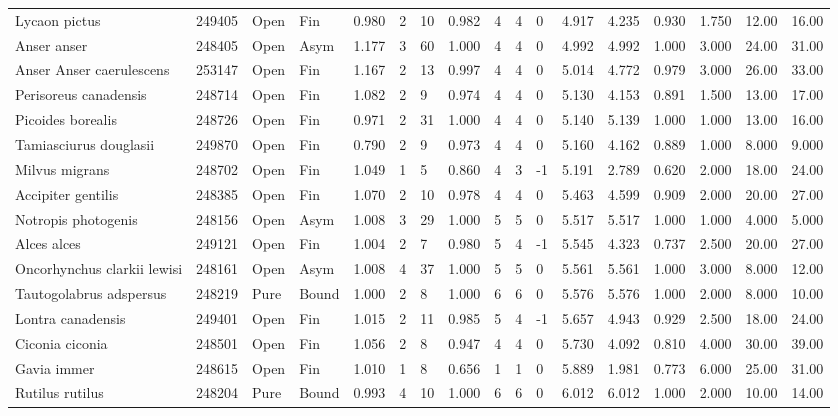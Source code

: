 \documentclass[10pt,a4paper]{amsart}
\theoremstyle{definition}
\theoremstyle{remark}
\numberwithin{equation}{section}
\begin{document}
\begin{table}[ht]
{\begin{tabular}{lllllllllllllllll}
Lycaon pictus & 249405 & Open & Fin & 0.980 & 2 & 10 & 0.982 & 4 & 4 & 0 & 4.917 & 4.235 & 0.930 & 1.750 & 12.00 & 16.00 \\
Anser anser & 248405 & Open & Asym & 1.177 & 3 & 60 & 1.000 & 4 & 4 & 0 & 4.992 & 4.992 & 1.000 & 3.000 & 24.00 & 31.00 \\
Anser Anser caerulescens & 253147 & Open & Fin & 1.167 & 2 & 13 & 0.997 & 4 & 4 & 0 & 5.014 & 4.772 & 0.979 & 3.000 & 26.00 & 33.00 \\
Perisoreus canadensis & 248714 & Open & Fin & 1.082 & 2 & 9 & 0.974 & 4 & 4 & 0 & 5.130 & 4.153 & 0.891 & 1.500 & 13.00 & 17.00 \\
Picoides borealis & 248726 & Open & Fin & 0.971 & 2 & 31 & 1.000 & 4 & 4 & 0 & 5.140 & 5.139 & 1.000 & 1.000 & 13.00 & 16.00 \\
Tamiasciurus douglasii & 249870 & Open & Fin & 0.790 & 2 & 9 & 0.973 & 4 & 4 & 0 & 5.160 & 4.162 & 0.889 & 1.000 & 8.000 & 9.000 \\
Milvus migrans & 248702 & Open & Fin & 1.049 & 1 & 5 & 0.860 & 4 & 3 & -1 & 5.191 & 2.789 & 0.620 & 2.000 & 18.00 & 24.00 \\
Accipiter gentilis & 248385 & Open & Fin & 1.070 & 2 & 10 & 0.978 & 4 & 4 & 0 & 5.463 & 4.599 & 0.909 & 2.000 & 20.00 & 27.00 \\
Notropis photogenis & 248156 & Open & Asym & 1.008 & 3 & 29 & 1.000 & 5 & 5 & 0 & 5.517 & 5.517 & 1.000 & 1.000 & 4.000 & 5.000 \\
Alces alces & 249121 & Open & Fin & 1.004 & 2 & 7 & 0.980 & 5 & 4 & -1 & 5.545 & 4.323 & 0.737 & 2.500 & 20.00 & 27.00 \\
Oncorhynchus clarkii lewisi & 248161 & Open & Asym & 1.008 & 4 & 37 & 1.000 & 5 & 5 & 0 & 5.561 & 5.561 & 1.000 & 3.000 & 8.000 & 12.00 \\
Tautogolabrus adspersus & 248219 & Pure & Bound & 1.000 & 2 & 8 & 1.000 & 6 & 6 & 0 & 5.576 & 5.576 & 1.000 & 2.000 & 8.000 & 10.00 \\
Lontra canadensis & 249401 & Open & Fin & 1.015 & 2 & 11 & 0.985 & 5 & 4 & -1 & 5.657 & 4.943 & 0.929 & 2.500 & 18.00 & 24.00 \\
Ciconia ciconia & 248501 & Open & Fin & 1.056 & 2 & 8 & 0.947 & 4 & 4 & 0 & 5.730 & 4.092 & 0.810 & 4.000 & 30.00 & 39.00 \\
Gavia immer & 248615 & Open & Fin & 1.010 & 1 & 8 & 0.656 & 1 & 1 & 0 & 5.889 & 1.981 & 0.773 & 6.000 & 25.00 & 31.00 \\
Rutilus rutilus & 248204 & Pure & Bound & 0.993 & 4 & 10 & 1.000 & 6 & 6 & 0 & 6.012 & 6.012 & 1.000 & 2.000 & 10.00 & 14.00 \\

\end{tabular}}
\end{table}
\end{document}
